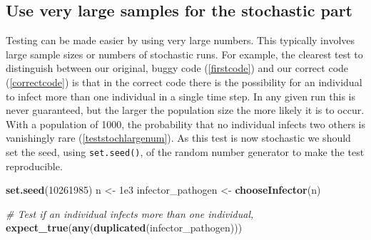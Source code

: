 \documentclass[
]{article}
\newenvironment{Shaded}{\begin{snugshade}}{\end{snugshade}}
\newcommand{\CommentTok}[1]{\textcolor[rgb]{0.56,0.35,0.01}{\textit{#1}}}
\newcommand{\DataTypeTok}[1]{\textcolor[rgb]{0.13,0.29,0.53}{#1}}
\newcommand{\DecValTok}[1]{\textcolor[rgb]{0.00,0.00,0.81}{#1}}
\newcommand{\FloatTok}[1]{\textcolor[rgb]{0.00,0.00,0.81}{#1}}
\newcommand{\KeywordTok}[1]{\textcolor[rgb]{0.13,0.29,0.53}{\textbf{#1}}}
\newcommand{\NormalTok}[1]{#1}
\newcommand{\OperatorTok}[1]{\textcolor[rgb]{0.81,0.36,0.00}{\textbf{#1}}}
\newcommand{\StringTok}[1]{\textcolor[rgb]{0.31,0.60,0.02}{#1}}
\begin{document}
\begin{Shaded}
\end{Shaded}

\hypertarget{largesamples}{%
\subsection*{Use very large samples for the stochastic part}\label{largesamples}}

Testing can be made easier by using very large numbers.
This typically involves large sample sizes or numbers of stochastic runs.
For example, the clearest test to distinguish between our original, buggy code (\ref{firstcode}) and our correct code (\ref{correctcode}) is that in the correct code there is the possibility for an individual to infect more than one individual in a single time step.
In any given run this is never guaranteed, but the larger the population size the more likely it is to occur.
With a population of 1000, the probability that no individual infects two others is vanishingly rare (\ref{teststochlargenum}).
As this test is now stochastic we should set the seed, using \texttt{set.seed()}, of the random number generator to make the test reproducible.
\newline
{}\label{teststochlargenum}

\begin{Shaded}
\begin{Highlighting}[]
\KeywordTok{set.seed}\NormalTok{(}\DecValTok{10261985}\NormalTok{)}
\NormalTok{n <-}\StringTok{ }\FloatTok{1e3}
\NormalTok{infector_pathogen <-}\StringTok{ }\KeywordTok{chooseInfector}\NormalTok{(n)}

\CommentTok{# Test if an individual infects more than one individual, }
\KeywordTok{expect_true}\NormalTok{(}\KeywordTok{any}\NormalTok{(}\KeywordTok{duplicated}\NormalTok{(infector_pathogen)))}
\end{Highlighting}
\end{Shaded}
\end{document}
